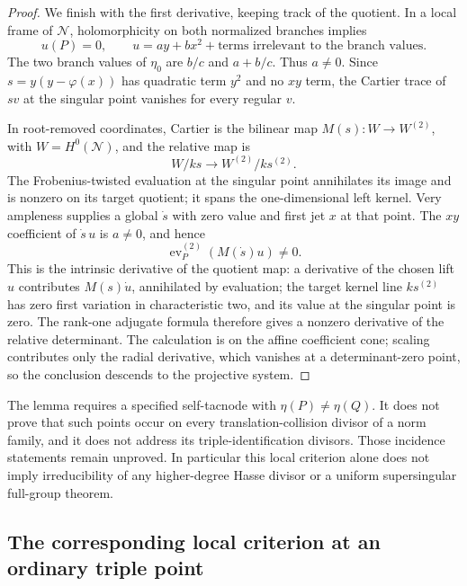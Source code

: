 \begin{proof}
We finish with the first derivative, keeping track of the quotient.
In a local frame of $\mathcal N$, holomorphicity on both normalized
branches implies
\[
        u(P)=0,\qquad
        u=a y+b x^2+\text{terms irrelevant to the branch values}.
\]
The two branch values of $\eta_0$ are $b/c$ and $a+b/c$.
Thus $a\ne0$. Since $s=y(y-\varphi(x))$ has quadratic term $y^2$
and no $xy$ term, the Cartier trace of $sv$ at the singular point
vanishes for every regular $v$.

In root-removed coordinates, Cartier is the bilinear map
$M(s):W\to W^{(2)}$, with $W=H^0(\mathcal N)$, and the relative
map is
\[
                   W/ks\longrightarrow W^{(2)}/ks^{(2)}.
\]
The Frobenius-twisted evaluation at the singular point annihilates
its image and is nonzero on its target quotient; it spans the
one-dimensional left kernel. Very ampleness supplies a global
$\dot s$ with zero value and first jet $x$ at that point. The
$xy$ coefficient of $\dot s\,u$ is $a\ne0$, and hence
\[
             \operatorname{ev}^{(2)}_P(M(\dot s)u)\ne0.
\]
This is the intrinsic derivative of the quotient map: a derivative
of the chosen lift $u$ contributes $M(s)\dot u$, annihilated by
evaluation; the target kernel line $ks^{(2)}$ has zero first
variation in characteristic two, and its value at the singular
point is zero. The rank-one adjugate formula therefore gives a
nonzero derivative of the relative determinant. The calculation
is on the affine coefficient cone; scaling contributes only the
radial derivative, which vanishes at a determinant-zero point, so
the conclusion descends to the projective system.
\end{proof}

\begin{remark}
\label{rem:ss-self-tacnode-global-gate}
The lemma requires a specified self-tacnode with
$\eta(P)\ne\eta(Q)$. It does not prove that such points occur on
every translation-collision divisor of a norm family, and it does
not address its triple-identification divisors. Those incidence
statements remain unproved. In particular this local criterion
alone does not imply irreducibility of any higher-degree Hasse
divisor or a uniform supersingular full-group theorem.
\end{remark}


\subsection{The corresponding local criterion at an ordinary triple point}
\label{subsec:ss-triple-point}

